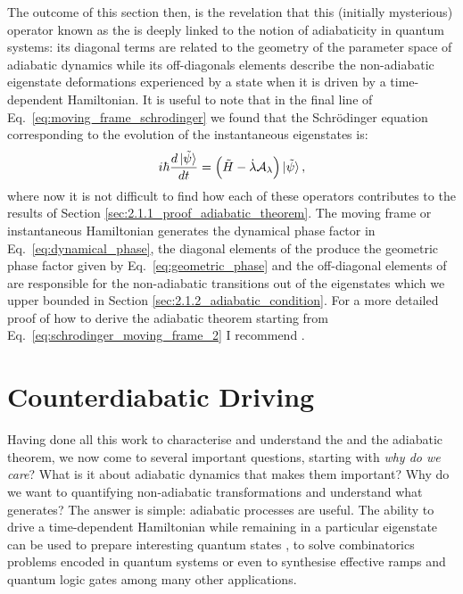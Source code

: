     The outcome of this section then, is the revelation that this (initially mysterious) operator known as the  is deeply linked to the notion of adiabaticity in quantum systems: its diagonal terms are related to the geometry of the parameter space of adiabatic dynamics while its off-diagonals elements describe the non-adiabatic eigenstate deformations experienced by a state when it is driven by a time-dependent Hamiltonian. It is useful to note that in the final line of Eq.~\eqref{eq:moving_frame_schrodinger} we found that the Schr\"{o}dinger equation corresponding to the evolution of the instantaneous eigenstates is:
    \begin{equation}\label{eq:schrodinger_moving_frame_2}
        i \hbar \frac{d \ket*{\Tilde{\psi}}}{dt} = \Big( \Tilde{H} - \dot{\lambda} \mathcal{A}_{\lambda} \Big) \ket*{\Tilde{\psi}},
    \end{equation}
    where now it is not difficult to find how each of these operators contributes to the results of Section \ref{sec:2.1.1_proof_adiabatic_theorem}. The moving frame or instantaneous Hamiltonian generates the dynamical phase factor in Eq.~\eqref{eq:dynamical_phase}, the diagonal elements of the  produce the geometric phase factor given by Eq.~\eqref{eq:geometric_phase} and the off-diagonal elements of  are responsible for the non-adiabatic transitions out of the eigenstates which we upper bounded in Section \ref{sec:2.1.2_adiabatic_condition}. For a more detailed proof of how to derive the adiabatic theorem starting from Eq.~\eqref{eq:schrodinger_moving_frame_2} I recommend \cite{petiziol_accelerated_2020}.
    
    \section{Counterdiabatic Driving}\label{sec:2.3_CD}

    Having done all this work to characterise and understand the  and the adiabatic theorem, we now come to several important questions, starting with \emph{why do we care}? What is it about adiabatic dynamics that makes them important? Why do we want to quantifying non-adiabatic transformations and understand what generates? The answer is simple: adiabatic processes are useful. The ability to drive a time-dependent Hamiltonian while remaining in a particular eigenstate can be used to prepare interesting quantum states \cite{dimitrova_many-body_2023}, to solve combinatorics problems encoded in quantum systems \cite{ebadi_quantum_2022, pichler_quantum_2018} or even to synthesise effective ramps and quantum logic gates \cite{pelegri_high-fidelity_2022} among many other applications. 
    
